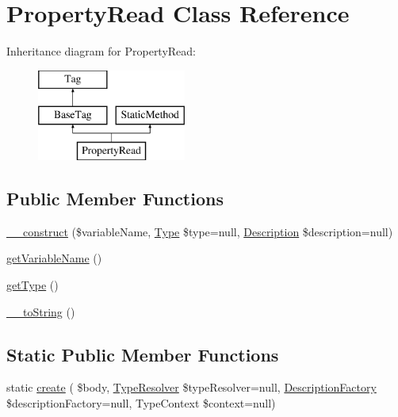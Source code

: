 \hypertarget{classphp_documentor_1_1_reflection_1_1_doc_block_1_1_tags_1_1_property_read}{}\section{Property\+Read Class Reference}
\label{classphp_documentor_1_1_reflection_1_1_doc_block_1_1_tags_1_1_property_read}
Inheritance diagram for Property\+Read\+:\begin{figure}[H]
\begin{center}
\leavevmode
\includegraphics[height=3.000000cm]{classphp_documentor_1_1_reflection_1_1_doc_block_1_1_tags_1_1_property_read}
\end{center}
\end{figure}
\subsection*{Public Member Functions}
\begin{DoxyCompactItemize}
\item 
\mbox{\hyperlink{classphp_documentor_1_1_reflection_1_1_doc_block_1_1_tags_1_1_property_read_a1e5de5b31a43e9ffe064e27942aa5e63}{\+\_\+\+\_\+construct}} (\$variable\+Name, \mbox{\hyperlink{interfacephp_documentor_1_1_reflection_1_1_type}{Type}} \$type=null, \mbox{\hyperlink{classphp_documentor_1_1_reflection_1_1_doc_block_1_1_description}{Description}} \$description=null)
\item 
\mbox{\hyperlink{classphp_documentor_1_1_reflection_1_1_doc_block_1_1_tags_1_1_property_read_a20af85a4f4041ed681b095e1427b2a1d}{get\+Variable\+Name}} ()
\item 
\mbox{\hyperlink{classphp_documentor_1_1_reflection_1_1_doc_block_1_1_tags_1_1_property_read_a830b5c75df72b32396701bc563fbe3c7}{get\+Type}} ()
\item 
\mbox{\hyperlink{classphp_documentor_1_1_reflection_1_1_doc_block_1_1_tags_1_1_property_read_a7516ca30af0db3cdbf9a7739b48ce91d}{\+\_\+\+\_\+to\+String}} ()
\end{DoxyCompactItemize}
\subsection*{Static Public Member Functions}
\begin{DoxyCompactItemize}
\item 
static \mbox{\hyperlink{classphp_documentor_1_1_reflection_1_1_doc_block_1_1_tags_1_1_property_read_a01b1e5c3741d05766720d8cb6d900172}{create}} ( \$body, \mbox{\hyperlink{classphp_documentor_1_1_reflection_1_1_type_resolver}{Type\+Resolver}} \$type\+Resolver=null, \mbox{\hyperlink{classphp_documentor_1_1_reflection_1_1_doc_block_1_1_description_factory}{Description\+Factory}} \$description\+Factory=null, Type\+Context \$context=null)
\end{DoxyCompactItemize}
